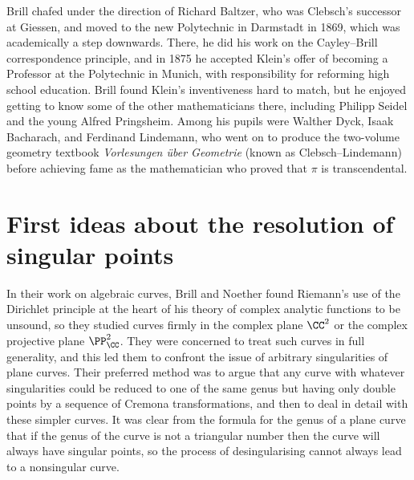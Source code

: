 Brill  chafed under the direction of  Richard Baltzer, who
%
was Clebsch's
%
successor at Giessen,  and moved to the new Polytechnic in Darmstadt
%
%
in 1869, which was academically a step downwards. There, he did his
work on the Cayley--Brill correspondence principle, and in 1875  he
accepted Klein's offer of becoming a Professor at the Polytechnic
%
in Munich, with responsibility for reforming high school education.
Brill found Klein's inventiveness
%
hard to match, but he enjoyed getting
to know some of the other mathematicians there, including Philipp
Seidel
%
and the young Alfred Pringsheim. Among
%
his pupils were Walther Dyck,
Isaak
%
%
Bacharach, and Ferdinand Lindemann,
%
 who went on to produce the
two-volume geometry textbook \emph{Vorlesungen \"uber Geometrie} (known
as Clebsch--Lindemann) before achieving fame as the mathematician who
proved that $\pi$ is transcendental.
%
%


\section{First ideas about the resolution of singular points}
In their work on algebraic curves, Brill and Noether found Riemann's use
of the Dirichlet principle
%
at the heart of his theory of complex analytic
functions
%
to be unsound, so they studied curves firmly in the complex
plane $\CC^2$ or the complex projective plane $\PP_{\CC}^2$. They were
concerned to treat such curves in full generality, and this led them
to confront the issue of arbitrary 
singularities
%
of plane curves. Their
preferred method was to argue that any curve with whatever singularities
could be reduced to one of the same genus but having only double points
by a sequence of Cremona transformations,
%
 and then to deal in detail
with these simpler curves. It was clear from the formula for the genus
%
of a plane curve that if the genus of the curve is not a triangular
number then the curve will always have singular points, so the process
of desingularising cannot always lead to a nonsingular curve.

